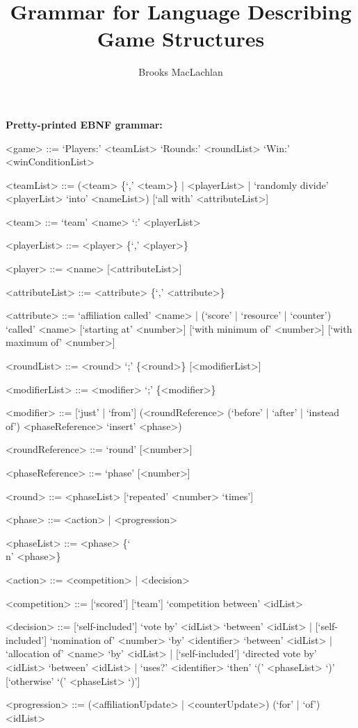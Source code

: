 \documentclass{article}
\title{Grammar for Language Describing Game Structures}
\author{Brooks MacLachlan}
\begin{document}
\maketitle

\noindent \textbf{Pretty-printed EBNF grammar:}
\begin{grammar}
<game> ::= `Players:' <teamList> `Rounds:' <roundList> `Win:' 
<winConditionList>

<teamList> ::= (<team> \{`,' <team>\} | <playerList> | `randomly divide' 
<playerList> `into' <nameList>) [`all with' <attributeList>]

<team> ::= `team' <name> `:' <playerList>

<playerList> ::= <player> \{`,' <player>\}

<player> ::= <name> [<attributeList>]

<attributeList> ::= <attribute> \{`,' <attribute>\}

<attribute> ::= `affiliation called' <name> | (`score' | `resource' | 
`counter') `called'
<name> [`starting at' <number>] [`with minimum of' <number>] [`with maximum of' 
<number>]

<roundList> ::= <round> `;' \{<round>\} [<modifierList>]

<modifierList> ::= <modifier> `;' \{<modifier>\}

<modifier> ::= [`just' | `from'] (<roundReference> (`before' | `after' | 
`instead of') 
<phaseReference> `insert' <phase>)

<roundReference> ::= `round' [<number>]

<phaseReference> ::= `phase' [<number>]

<round> ::= <phaseList> [`repeated' <number> `times']

<phase> ::= <action> | <progression>

<phaseList> ::= <phase> \{`\\n' <phase>\}

<action> ::= <competition> | <decision>

<competition> ::= [`scored'] [`team'] `competition between' <idList>

<decision> ::= [`self-included'] `vote by' <idList> `between' <idList> | 
[`self-included'] `nomination of' <number> `by' <identifier> `between' <idList> 
| `allocation of' <name> `by' <idList> | [`self-included'] `directed vote by' 
<idList> `between' 
<idList> | `uses?' <identifier> `then' `(' <phaseList> `)' [`otherwise' `(' 
<phaseList> `)']

<progression> ::= (<affiliationUpdate> | <counterUpdate>) (`for' | `of') 
<idList>


\end{grammar}
\end{document}
